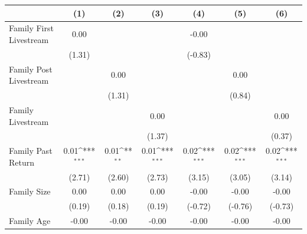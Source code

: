 {
\def\sym#1{\ifmmode^{#1}\else\(^{#1}\)\fi}
\begin{tabular}{l*{6}{c}}
\toprule
                    &\multicolumn{1}{c}{(1)}         &\multicolumn{1}{c}{(2)}         &\multicolumn{1}{c}{(3)}         &\multicolumn{1}{c}{(4)}         &\multicolumn{1}{c}{(5)}         &\multicolumn{1}{c}{(6)}         \\
\midrule
Family First Livestream&        0.00         &                     &                     &       -0.00         &                     &                     \\
                    &      (1.31)         &                     &                     &     (-0.83)         &                     &                     \\
\addlinespace
Family Post Livestream&                     &        0.00         &                     &                     &        0.00         &                     \\
                    &                     &      (1.31)         &                     &                     &      (0.84)         &                     \\
\addlinespace
Family Livestream   &                     &                     &        0.00         &                     &                     &        0.00         \\
                    &                     &                     &      (1.37)         &                     &                     &      (0.37)         \\
\addlinespace
Family Past Return  &        0.01\sym{***}&        0.01\sym{**} &        0.01\sym{***}&        0.02\sym{***}&        0.02\sym{***}&        0.02\sym{***}\\
                    &      (2.71)         &      (2.60)         &      (2.73)         &      (3.15)         &      (3.05)         &      (3.14)         \\
\addlinespace
Family Size         &        0.00         &        0.00         &        0.00         &       -0.00         &       -0.00         &       -0.00         \\
                    &      (0.19)         &      (0.18)         &      (0.19)         &     (-0.72)         &     (-0.76)         &     (-0.73)         \\
\addlinespace
Family Age          &       -0.00         &       -0.00         &       -0.00         &       -0.00         &       -0.00         &       -0.00         \\

\end{tabular}}
